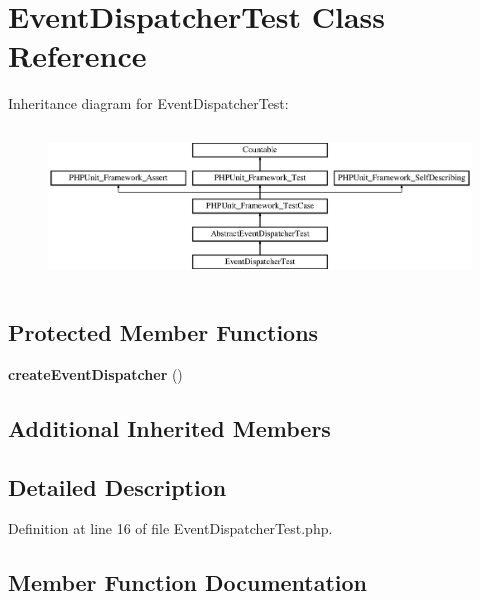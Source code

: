\section{Event\+Dispatcher\+Test Class Reference}
\label{class_symfony_1_1_component_1_1_event_dispatcher_1_1_tests_1_1_event_dispatcher_test}
Inheritance diagram for Event\+Dispatcher\+Test\+:\begin{figure}[H]
\begin{center}
\leavevmode
\includegraphics[height=4.129793cm]{class_symfony_1_1_component_1_1_event_dispatcher_1_1_tests_1_1_event_dispatcher_test}
\end{center}
\end{figure}
\subsection*{Protected Member Functions}
\begin{DoxyCompactItemize}
\item 
{\bf create\+Event\+Dispatcher} ()
\end{DoxyCompactItemize}
\subsection*{Additional Inherited Members}


\subsection{Detailed Description}


Definition at line 16 of file Event\+Dispatcher\+Test.\+php.



\subsection{Member Function Documentation}
